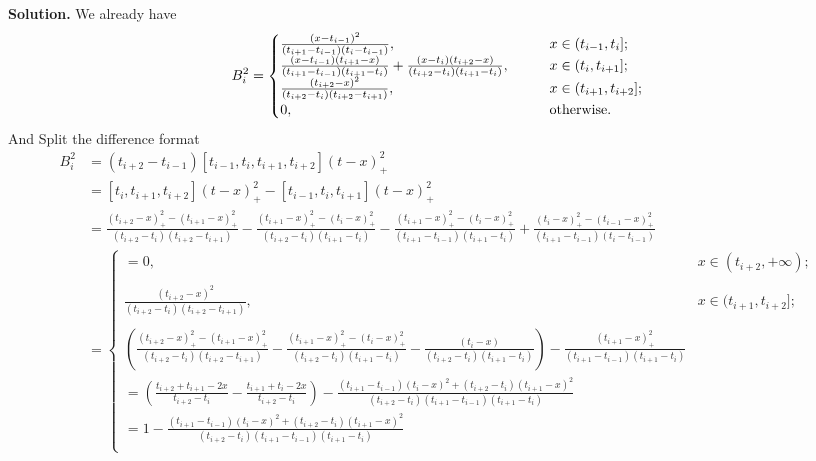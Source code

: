 \documentclass[a4paper]{book}
\newenvironment{solution}%
{\noindent\textbf{Solution.}}%
{\qedhere}
\numberwithin{equation}{chapter}
\theoremstyle{definition}
\begin{document}
\begin{solution}
  We already have
  \begin{align*}
    B_i^2 =
    \begin{cases}
      \frac{(x - t_{i-1})^2}{(t_{i+1} - t_{i-1})(t_i - t_{i-1})}, \qquad &x \in (t_{i-1},t_i]; \\
      \frac{(x - t_{i-1})(t_{i+1} - x)}{(t_{i+1} - t_{i-1})(t_{i+1} - t_i)} + \frac{(x - t_{i})(t_{i+2} - x)}{(t_{i+2} - t_{i})(t_{i+1} - t_i)}, \qquad &x \in (t_{i},t_{i+1}]; \\
      \frac{(t_{i+2} - x)^2}{(t_{i+2} - t_{i})(t_{i+2} - t_{i+1})}, \qquad &x \in (t_{i+1},t_{i+2}]; \\
      0, \qquad &\textmd{otherwise}.
    \end{cases}
  \end{align*}
  And Split the difference format
  \begin{align*}
    B_i^2 &= (t_{i+2} - t_{i-1})[t_{i-1},t_i,t_{i+1},t_{i+2}](t - x)_+^2 \\
          &= [t_i,t_{i+1},t_{i+2}](t - x)_+^2 - [t_{i-1},t_i,t_{i+1}](t - x)_+^2 \\
          &= \frac{(t_{i+2}-x)_+^2 - (t_{i+1}-x)_+^2}{(t_{i+2}-t_{i})(t_{i+2}-t_{i+1})} -
            \frac{(t_{i+1}-x)_+^2 - (t_{i}-x)_+^2}{(t_{i+2}-t_{i})(t_{i+1}-t_{i})} -
            \frac{(t_{i+1}-x)_+^2 - (t_{i}-x)_+^2}{(t_{i+1}-t_{i-1})(t_{i+1}-t_{i})} +
            \frac{(t_{i}-x)_+^2 - (t_{i-1}-x)_+^2}{(t_{i+1}-t_{i-1})(t_{i}-t_{i-1})} \\
    &=
      \begin{cases}
        = 0, & x \in (t_{i+2}, +\infty); \\ \\
        \frac{(t_{i+2} - x)^2}{(t_{i+2} - t_{i})(t_{i+2} - t_{i+1})}, \qquad &x \in (t_{i+1},t_{i+2}];\\ \\
        (\frac{(t_{i+2}-x)_+^2 - (t_{i+1}-x)_+^2}{(t_{i+2}-t_{i})(t_{i+2}-t_{i+1})} -
        \frac{(t_{i+1}-x)_+^2 - (t_{i}-x)_+^2  }{(t_{i+2}-t_{i})(t_{i+1}-t_{i})} - \frac{(t_{i}-x)}{(t_{i+2}-t_{i})(t_{i+1}-t_{i})}) -
        \frac{(t_{i+1}-x)_+^2 }{(t_{i+1}-t_{i-1})(t_{i+1}-t_{i})} \\
        = (\frac{t_{i+2} + t_{i+1} - 2x}{t_{i+2} - t_{i}} - \frac{t_{i+1} + t_{i} - 2x}{t_{i+2} - t_{i}}) - \frac{(t_{i+1} - t_{i-1})(t_i -x)^2 + (t_{i+2} - t_{i})(t_{i+1} - x)^2}{(t_{i+2} - t_{i})(t_{i+1} - t_{i-1})(t_{i+1} - t_i)} \\
        = 1 - \frac{(t_{i+1} - t_{i-1})(t_i -x)^2 + (t_{i+2} - t_{i})(t_{i+1} - x)^2}{(t_{i+2} - t_{i})(t_{i+1} - t_{i-1})(t_{i+1} - t_i)} \\

\end{cases}
\end{align*}
\end{solution}
\end{document}
